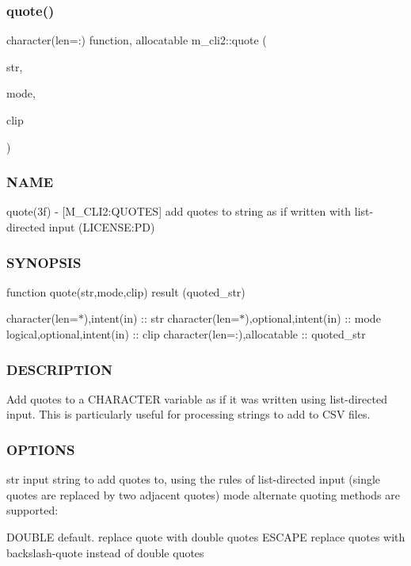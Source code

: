 \subsubsection{\texorpdfstring{quote()}{quote()}}
{\footnotesize\ttfamily character(len=\+:) function, allocatable m\+\_\+cli2\+::quote (\begin{DoxyParamCaption}\item[{character(len=$\ast$), intent(in)}]{str,  }\item[{character(len=$\ast$), intent(in), optional}]{mode,  }\item[{logical, intent(in), optional}]{clip }\end{DoxyParamCaption})\hspace{0.3cm}{\ttfamily [private]}}



\subsubsection*{N\+A\+ME}

quote(3f) -\/ \mbox{[}M\+\_\+\+C\+L\+I2\+:Q\+U\+O\+T\+ES\mbox{]} add quotes to string as if written with list-\/directed input (L\+I\+C\+E\+N\+SE\+:PD) \subsubsection*{S\+Y\+N\+O\+P\+S\+IS}

function quote(str,mode,clip) result (quoted\+\_\+str)

character(len=$\ast$),intent(in) \+:\+: str character(len=$\ast$),optional,intent(in) \+:\+: mode logical,optional,intent(in) \+:\+: clip character(len=\+:),allocatable \+:\+: quoted\+\_\+str \subsubsection*{D\+E\+S\+C\+R\+I\+P\+T\+I\+ON}

Add quotes to a C\+H\+A\+R\+A\+C\+T\+ER variable as if it was written using list-\/directed input. This is particularly useful for processing strings to add to C\+SV files.

\subsubsection*{O\+P\+T\+I\+O\+NS}

str input string to add quotes to, using the rules of list-\/directed input (single quotes are replaced by two adjacent quotes) mode alternate quoting methods are supported\+: \begin{DoxyVerb}           DOUBLE   default. replace quote with double quotes
           ESCAPE   replace quotes with backslash-quote instead of double quotes
\end{DoxyVerb}


